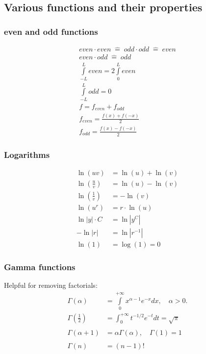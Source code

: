 \subsection{Various functions and their properties}
\subsubsection{even and odd functions}
\noindent
\begin{gather*}
    even \cdot even\;\widehat{=}\; odd \cdot odd \;\widehat{=}\; even \\
    even \cdot odd \;\widehat{=}\; odd \\
    \int\limits_{-L}^L even=2\int\limits_0^L even \\
    \int\limits_{-L}^L odd = 0 \\
    f=f_{even}+f_{odd} \\
    f_{even}=\frac{f(x)+f(-x)}{2} \\
    f_{odd}=\frac{f(x)-f(-x)}{2}
\end{gather*}

\subsubsection{Logarithms}
\noindent
\begin{align*}
    \ln(uv)                     & =\ln(u)+\ln(v) \\
    \ln\left(\frac{u}{v}\right) & =\ln(u)-\ln(v) \\
    \ln\left(\frac{1}{v}\right) & =-\ln(v)       \\
    \ln(u^r)                    & =r\cdot \ln(u) \\
    \ln |y|\cdot C              & = \ln |y^C|    \\
    - \ln |r|                   & = \ln|r^{-1}|  \\
    \ln(1)                      & = \log(1) = 0
\end{align*}


\subsubsection{Gamma functions}
Helpful for removing factorials:
\begin{align*}
    \Gamma(\alpha)             & =\int\limits_{0}^{+\infty}x^{\alpha-1}e^{-x}dx,\quad\alpha>0. \\
    \Gamma\left(\frac12\right) & =\int_0^{+\infty}t^{-1/2}e^{-t}dt=\sqrt{\pi}                  \\ \\
    \Gamma(\alpha+1)           & =\alpha\Gamma(\alpha),\quad \Gamma(1)=1                       \\ \\
    \Gamma(n)                  & =(n-1)!
\end{align*}

